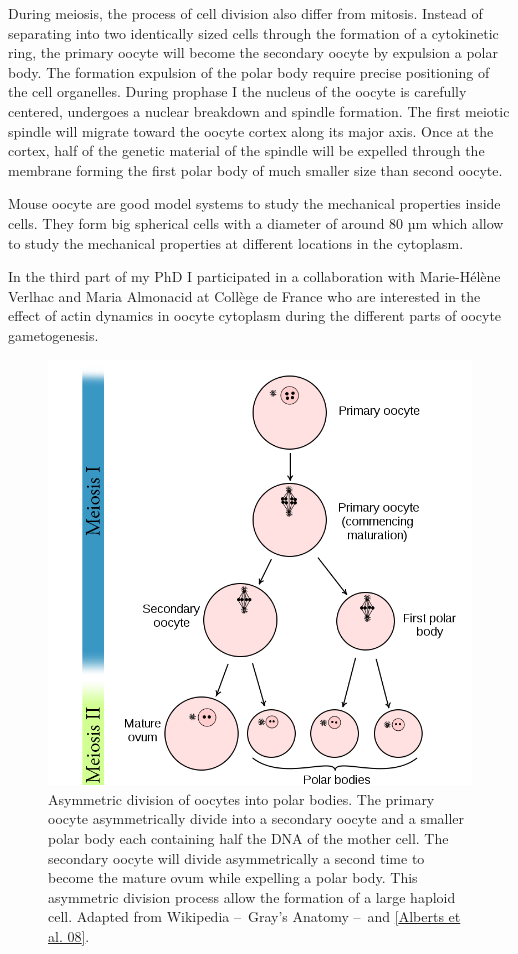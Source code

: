 \documentclass[A4paperpaper,11pt,english]{sphinxmanual}
\begin{document}
During meiosis, the process of cell division also differ from mitosis. Instead
of separating into two identically sized cells through the formation of a
cytokinetic ring, the primary oocyte will become the secondary oocyte by
expulsion a polar body. The formation expulsion of the polar body require
precise positioning of the cell organelles. During prophase I the nucleus of
the oocyte is carefully centered, undergoes a nuclear breakdown and spindle formation.
The first meiotic spindle will migrate toward the oocyte cortex along
its major axis. Once at the cortex, half of the genetic material of the spindle
will be expelled through the membrane forming the first polar body of much
smaller size than second oocyte.

Mouse oocyte are good model systems to study the mechanical properties inside
cells. They form big spherical cells with a diameter of around 80 µm
which allow to study the mechanical properties at different locations in
the cytoplasm.

In the third part of my PhD I participated in a collaboration with Marie-Hélène
Verlhac and Maria Almonacid at Collège de France who are interested in the
effect of actin dynamics in oocyte cytoplasm during the different parts of
oocyte gametogenesis.
\begin{figure}[htbp]
\centering
\capstart

\includegraphics[width=0.800\linewidth]{oocyte-polar.png}
\caption{Asymmetric division of oocytes into polar bodies. The primary oocyte
asymmetrically divide into a secondary oocyte and a smaller polar body each
containing half the DNA of the mother cell. The secondary oocyte will
divide asymmetrically a second time to become the mature ovum while
expelling a polar body. This asymmetric division process allow the
formation of a large haploid cell. Adapted from Wikipedia – Gray's
Anatomy – and {\hyperref[index-latex:alberts2008]{{[}Alberts et al. 08{]}}}.}\label{index-latex:fig-asymetric-division}\end{figure}
\end{document}
